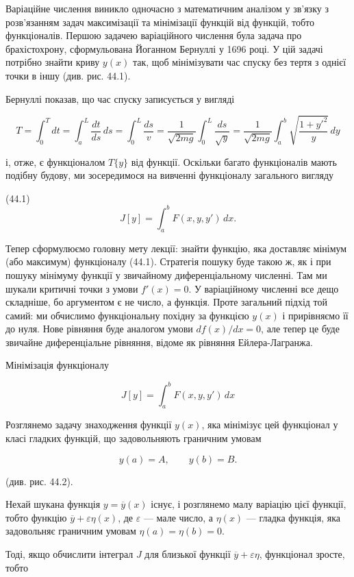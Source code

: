 \documentclass[
  ukrainian,
]{article}
\begin{document}
Варіаційне числення виникло одночасно з математичним аналізом у зв'язку
з розв'язанням задач максимізації та мінімізації функцій від функцій,
тобто функціоналів. Першою задачею варіаційного числення була задача про
брахістохрону, сформульована Йоганном Бернуллі у 1696 році. У цій задачі
потрібно знайти криву \(y(x)\) так, щоб мінімізувати час спуску без
тертя з однієї точки в іншу (див. рис. 44.1).

Бернуллі показав, що час спуску записується у вигляді

\[
T = \int_0^T dt = \int_a^L \frac{dt}{ds}\,ds = \int_0^L \frac{ds}{v}
= \frac{1}{\sqrt{2mg}} \int_0^L \frac{ds}{\sqrt{y}}
= \frac{1}{\sqrt{2mg}} \int_a^b \sqrt{\frac{1+y'^2}{y}}\,dy
\]

і, отже, є функціоналом \(T\{y\}\) від функції. Оскільки багато
функціоналів мають подібну будову, ми зосередимося на вивченні
функціоналу загального вигляду

(44.1) \[
J[y] = \int_a^b F(x, y, y')\,dx.
\]

Тепер сформулюємо головну мету лекції: знайти функцію, яка доставляє
мінімум (або максимум) функціоналу (44.1). Стратегія пошуку буде такою
ж, як і при пошуку мінімуму функції у звичайному диференціальному
численні. Там ми шукали критичні точки з умови \(f'(x)=0\). У
варіаційному численні все дещо складніше, бо аргументом є не число, а
функція. Проте загальний підхід той самий: ми обчислимо функціональну
похідну за функцією \(y(x)\) і прирівняємо її до нуля. Нове рівняння
буде аналогом умови \(df(x)/dx = 0\), але тепер це буде звичайне
диференціальне рівняння, відоме як рівняння Ейлера-Лагранжа.

Мінімізація функціоналу

\[
J[y] = \int_a^b F(x, y, y')\,dx
\]

Розглянемо задачу знаходження функції \(y(x)\), яка мінімізує цей
функціонал у класі гладких функцій, що задовольняють граничним умовам

\[
y(a) = A, \qquad y(b) = B.
\]

(див. рис. 44.2).

Нехай шукана функція \(y = \overline{y}(x)\) існує, і розглянемо малу
варіацію цієї функції, тобто функцію
\(\overline{y} + \varepsilon\eta(x)\), де \(\varepsilon\) --- мале
число, а \(\eta(x)\) --- гладка функція, яка задовольняє граничним
умовам \(\eta(a)=\eta(b)=0\).

Тоді, якщо обчислити інтеграл \(J\) для близької функції
\(\overline{y} + \varepsilon\eta\), функціонал зросте, тобто
\end{document}
